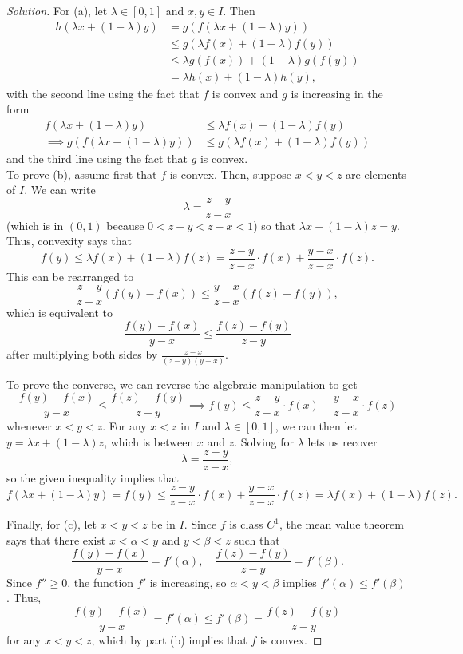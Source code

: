 \documentclass[11pt]{scrartcl}
\newenvironment{soln}{\begin{proof}[Solution]}{\end{proof}}
\begin{document}
\begin{soln}
	For (a), let $\lambda\in[0,1]$ and $x,y\in I$. Then
	\begin{align*}
		h(\lambda x + (1-\lambda)y) &=
		g(f(\lambda x + (1-\lambda)y))\\
		&\le g(\lambda f(x) + (1-\lambda)f(y))\\
		&\le \lambda g(f(x)) + (1-\lambda)g(f(y))\\
		&= \lambda h(x) + (1-\lambda)h(y),
	\end{align*}
	with the second line using the fact that $f$ is convex
	and $g$ is increasing in the form
	\begin{align*}
		f(\lambda x + (1-\lambda) y) &\le \lambda f(x) + (1-\lambda) f(y)\\
		\implies g(f(\lambda x + (1-\lambda) y)) &\le
		g(\lambda f(x) + (1-\lambda) f(y))
	\end{align*}
	and the third line using the fact that $g$ is convex.\\
	
	To prove (b), assume first that $f$ is convex.
	Then, suppose $x < y < z$ are elements of $I$. We can write
	\[\lambda = \frac{z - y}{z - x}\]
	(which is in $(0,1)$ because $0 < z-y < z-x < 1$) so that
	$\lambda x + (1-\lambda)z = y$. Thus, convexity says that
	\[f(y) \le \lambda f(x) + (1-\lambda) f(z)
	= \frac{z-y}{z-x}\cdot f(x) + \frac{y-x}{z-x} \cdot f(z).\]
	This can be rearranged to
	\[\frac{z-y}{z-x}(f(y) - f(x)) \le \frac{y-x}{z-x}(f(z) - f(y)),\]
	which is equivalent to
	\[\frac{f(y) - f(x)}{y-x} \le \frac{f(z) - f(y)}{z - y}\]
	after multiplying both sides by $\frac{z-x}{(z-y)(y-x)}$.
	
	To prove the converse, we can reverse the algebraic manipulation to get
	\[\frac{f(y) - f(x)}{y-x} \le \frac{f(z) - f(y)}{z - y} \implies
	f(y) \le \frac{z-y}{z-x}\cdot f(x) + \frac{y-x}{z-x} \cdot f(z)\]
	whenever $x < y < z$.
	For any $x < z$ in $I$ and $\lambda\in[0,1]$, we can then let
	$y = \lambda x + (1-\lambda)z$, which is between $x$ and $z$.
	Solving for $\lambda$ lets us recover
	\[\lambda = \frac{z-y}{z-x},\]
	so the given inequality implies that
	\[f(\lambda x + (1-\lambda)y) = f(y)
	\le \frac{z-y}{z-x}\cdot f(x) + \frac{y-x}{z-x} \cdot f(z)
	= \lambda f(x) + (1-\lambda) f(z).\]
	
	Finally, for (c), let $x < y < z$ be in $I$.
	Since $f$ is class $C^1$,
	the mean value theorem says that there exist
	$x < \alpha < y$ and $y < \beta < z$ such that
	\[\frac{f(y) - f(x)}{y - x} = f'(\alpha),\quad
	\frac{f(z) - f(y)}{z - y} = f'(\beta).\]
	Since $f'' \ge 0$, the function $f'$ is increasing, so
	$\alpha < y < \beta$ implies $f'(\alpha) \le f'(\beta)$. Thus,
	\[\frac{f(y) - f(x)}{y - x} = f'(\alpha)
	\le f'(\beta) = \frac{f(z) - f(y)}{z - y}\]
	for any $x < y < z$, which by part (b) implies that $f$ is convex.
\end{soln}
\end{document}
